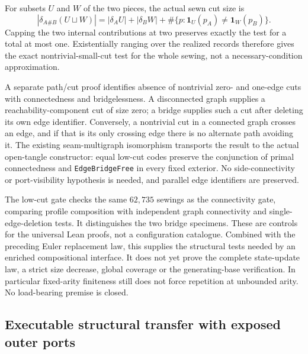 For subsets $U$ and $W$ of the two pieces, the actual sewn cut size is
\[
 |\delta_{A\#B}(U\sqcup W)|
 =|\delta_A U|+|\delta_B W|
   +\#\{p:\mathbf{1}_U(p_A)\ne\mathbf{1}_W(p_B)\}.
\]
Capping the two internal contributions at two preserves exactly the
test for a total at most one. Existentially ranging over the realized
records therefore gives the exact nontrivial-small-cut test for the
whole sewing, not a necessary-condition approximation.

A separate path/cut proof identifies absence of nontrivial zero- and
one-edge cuts with connectedness and bridgelessness. A disconnected
graph supplies a reachability-component cut of size zero; a bridge
supplies such a cut after deleting its own edge identifier. Conversely,
a nontrivial cut in a connected graph crosses an edge, and if that is
its only crossing edge there is no alternate path avoiding it.
The existing seam-multigraph isomorphism transports the result to the
actual open-tangle constructor: equal low-cut codes preserve the
conjunction of primal connectedness and \texttt{EdgeBridgeFree} in
every fixed exterior. No side-connectivity or port-visibility hypothesis
is needed, and parallel edge identifiers are preserved.

The low-cut gate checks the same $62{,}735$ sewings as the connectivity
gate, comparing profile composition with independent graph connectivity
and single-edge-deletion tests. It distinguishes the two bridge
specimens. These are controls for the universal Lean proofs, not a
configuration catalogue. Combined with the preceding Euler replacement
law, this supplies the structural tests needed by an enriched
compositional interface. It does not yet prove the complete state-update
law, a strict size decrease, global coverage or the generating-base
verification. In particular fixed-arity finiteness still does not force
repetition at unbounded arity. No load-bearing premise is closed.

\subsection{Executable structural transfer with exposed outer ports}
\label{sec:small-cut-open-transfer}

